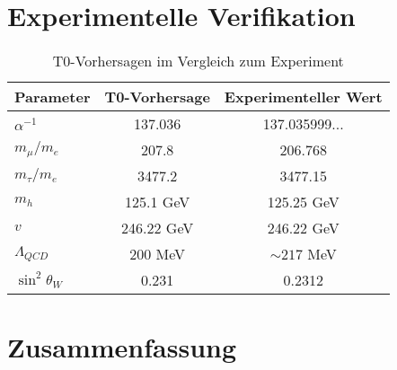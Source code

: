 \documentclass[12pt,a4paper]{article}
\begin{document}
	\section{Experimentelle Verifikation}
	
	\begin{table}[H]
		\centering
		\begin{tabular}{lcc}
			\toprule
			\textbf{Parameter} & \textbf{T0-Vorhersage} & \textbf{Experimenteller Wert} \\
			\midrule
			$\alpha^{-1}$ & 137.036 & 137.035999... \\
			$m_\mu/m_e$ & 207.8 & 206.768 \\
			$m_\tau/m_e$ & 3477.2 & 3477.15 \\
			$m_h$ & 125.1 GeV & 125.25 GeV \\
			$v$ & 246.22 GeV & 246.22 GeV \\
			$\Lambda_{QCD}$ & 200 MeV & $\sim 217$ MeV \\
			$\sin^2\theta_W$ & 0.231 & 0.2312 \\
			\bottomrule
		\end{tabular}
		\caption{T0-Vorhersagen im Vergleich zum Experiment}
	\end{table}
	
	\section{Zusammenfassung}
	
\end{document}
